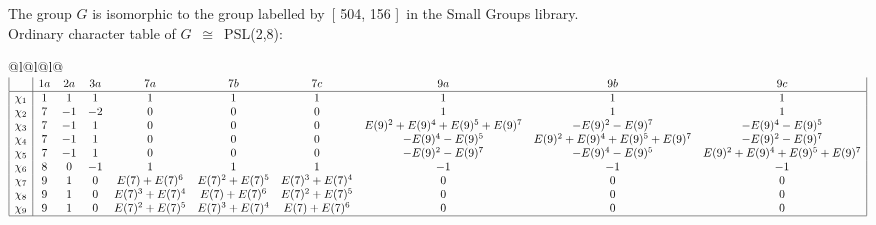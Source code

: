 \documentclass[varwidth=\maxdimen,border=10]{standalone}
\begin{document}
The group $G$ is isomorphic to the group labelled by\ [ 504, 156 ]\ in the Small Groups library.\\
Ordinary character table of $G$\ $\cong$\ PSL(2,8):\\
\begin{center}
\begin{tabular}{@{}l@{}l@{}l@{}}
\hline
\(\begin{array}{|l|ccccccccc|}
  & 1a & 2a & 3a & 7a & 7b & 7c & 9a & 9b & 9c\\ \hline
\chi_{1} & 1 & 1 & 1 & 1 & 1 & 1 & 1 & 1 & 1\\
\chi_{2} & 7 & -1 & -2 & 0 & 0 & 0 & 1 & 1 & 1\\
\chi_{3} & 7 & -1 & 1 & 0 & 0 & 0 & E(9)^{2}+E(9)^{4}+E(9)^{5}+E(9)^{7} & -E(9)^{2}-E(9)^{7} & -E(9)^{4}-E(9)^{5}\\
\chi_{4} & 7 & -1 & 1 & 0 & 0 & 0 & -E(9)^{4}-E(9)^{5} & E(9)^{2}+E(9)^{4}+E(9)^{5}+E(9)^{7} & -E(9)^{2}-E(9)^{7}\\
\chi_{5} & 7 & -1 & 1 & 0 & 0 & 0 & -E(9)^{2}-E(9)^{7} & -E(9)^{4}-E(9)^{5} & E(9)^{2}+E(9)^{4}+E(9)^{5}+E(9)^{7}\\
\chi_{6} & 8 & 0 & -1 & 1 & 1 & 1 & -1 & -1 & -1\\
\chi_{7} & 9 & 1 & 0 & E(7)+E(7)^{6} & E(7)^{2}+E(7)^{5} & E(7)^{3}+E(7)^{4} & 0 & 0 & 0\\
\chi_{8} & 9 & 1 & 0 & E(7)^{3}+E(7)^{4} & E(7)+E(7)^{6} & E(7)^{2}+E(7)^{5} & 0 & 0 & 0\\
\chi_{9} & 9 & 1 & 0 & E(7)^{2}+E(7)^{5} & E(7)^{3}+E(7)^{4} & E(7)+E(7)^{6} & 0 & 0 & 0\\
\hline
\end{array}\)\\
\end{tabular}
\end{center}
\end{document}
